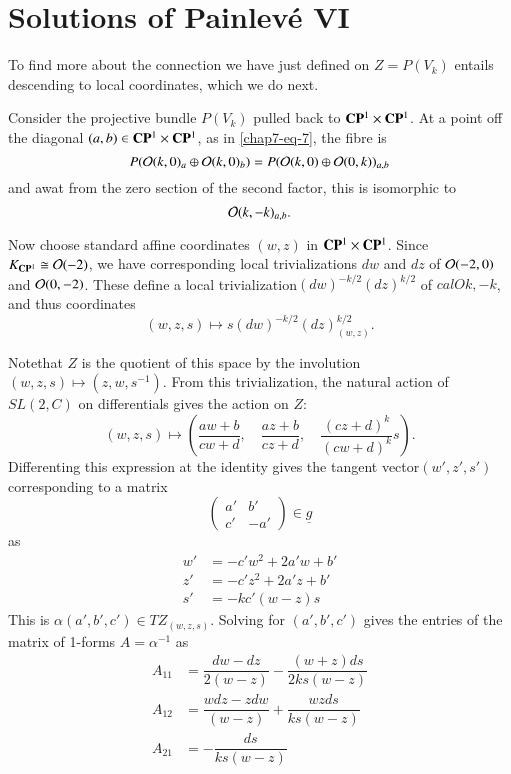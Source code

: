 \section{Solutions of Painlev\'e VI}\label{chap7-sec-5}

To find more about the connection we have just defined on $Z=P(V_{k})$ entails descending to local coordinates, which we do next.

Consider the projective bundle $P(V_{k})$ pulled back to $\mathbf{C}\mathbf{P}^{1} \times \mathbf{C}\mathbf{P}^{1}$. At a point off the diagonal $(a, b) \in \mathbf{C}\mathbf{P}^{1} \times \mathbf{C}\mathbf{P}^{1}$, as in \eqref{chap7-eq-7}, the fibre is
$$
P(\mathcal{O}(k,0)_{a} \oplus \mathcal{O}(k,0)_{b}) = P(\mathcal{O}(k,0) \oplus \mathcal{O}(0,k))_{a,b}
$$
and awat from the zero section of the second factor, this is isomorphic to
$$
\mathcal{O}(k,-k)_{a,b}.
$$

Now choose standard affine coordinates $(w,z)$ in $\mathbf{C}\mathbf{P}^{1} \times \mathbf{C}\mathbf{P}^{1}$. Since $K_{\mathbf{C}\mathbf{P}^{1}} \cong \mathcal{O} (-2)$, we have corresponding local trivializations $dw$ and $dz$ of $\mathcal{O}(-2, 0)$ and $\mathcal{O}(0, -2)$. These define a local trivialization\break $(dw)^{-k/2}(dz)^{k/2}$ of $calO{k, -k}$, and thus coordinates
$$
(w, z, s)\mapsto s(dw)^{-k/2}(dz)_{(w,z)}^{k/2}.
$$

\newpage
\noindent
Note\pageoriginale that $Z$ is the quotient of this space by the involution $(w,z, s) \mapsto (z,w,s^{-1})$. From this trivialization, the natural action of $ SL(2, C)$ on differentials gives the action on $Z$:
$$
(w, z, s) \mapsto \left( \dfrac{aw+b}{cw+d},\quad  \dfrac{az+b}{cz+d},\quad \dfrac{(cz+d)^{k}}{(cw +d)^{k}} s\right).
$$
Differenting this expression at the identity gives the tangent vector\break $(w', z', s')$
corresponding to a matrix
$$
\left(
\begin{matrix}
a' & b'\\
c' & -a'
\end{matrix}
\right)
\in \underline{g}
$$
as
\begin{align*}
w' &= -c'w^{2} +2a'w +b'\\
z'&= -c'z^{2} + 2a'z +b'\\
s' &= -kc'(w-z)s
\end{align*}
This is $\alpha(a',b', c') \in TZ_{(w,z,s)}$. Solving for $(a',b',c')$ gives the entries of the matrix of 1-forms $A=\alpha^{-1}$ as 
\begin{align*}\label{chap7-eq-12}
A_{11} &= \dfrac{dw-dz}{2(w-z)} - \dfrac{(w+z)ds}{2ks(w-z)} \nonumber\\
A_{12} &= \dfrac{wdz-zdw}{(w-z)} + \dfrac{wzds}{ks(w-z)}\tag{12}\\
A_{21} &= -\dfrac{ds}{ks(w-z)}\nonumber
\end{align*}

